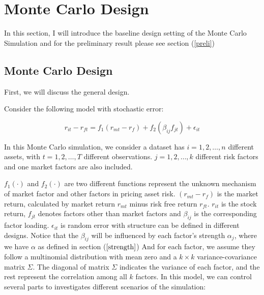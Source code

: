 
%

%

		\section{Monte Carlo Design}\label{MC}
	In this section, I will introduce the baseline design setting of the Monte Carlo Simulation and  for the preliminary result please see section (\ref{preli})
	
		\subsection{Monte Carlo Design}
	First, we will discuss the general design.
	
	Consider the following model with stochastic error:
	
	\[  r_{it} - r_{ft} = f_1({r_{mt}} - r_f) + f_2( \beta_{ij}f_{jt}) +\epsilon_{it}  \]
	
	In this Monte Carlo simulation, we consider a dataset has $i = 1, 2,\dots, n$ different assets, with $t= 1, 2,\dots, T$ different observations. 
	$j = 1, 2, \dots, k$ different risk factors and one market factors are also included.
	
	$f_1(\cdot)$ and $f_2(\cdot)$ are two different functions represent the unknown mechanism of market factor and other factors in pricing asset risk.
	$({r_{mt}}- r_f) $ is the market return, calculated by market  return ${r_{mt}}$ minus risk free return $r_{ft}$. 
	$r_{it}$ is the stock return, $f_{jt}$ denotes factors other than market factors and $\beta_{ij}$ is the corresponding factor loading. 
	$\epsilon_{it}$ is random error with structure can be defined in different designs.
	Notice that the $\beta_{ij}$ will be influenced by each factor's strength $\alpha_j$, where we have $\alpha$ as defined in section ($\ref{strength}$)
	And for each factor, we assume they follow a multinomial distribution with mean zero and a $k\times k$ variance-covariance matrix $\Sigma$. 
	The diagonal of matrix $\Sigma$ indicates the variance of each factor, and the rest represent the correlation among all $k$ factors.
	In this model, we can control several parts to investigates different scenarios of the simulation:
